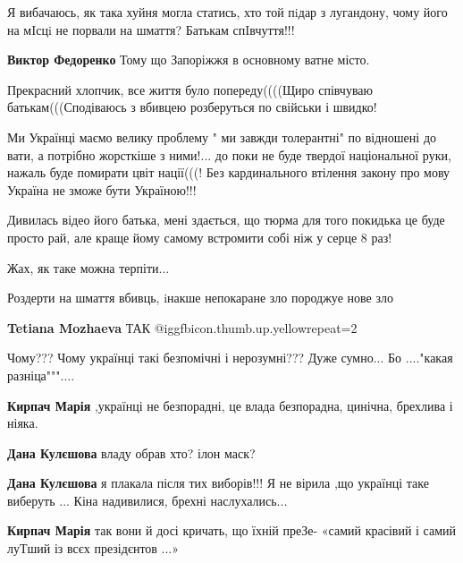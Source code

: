 \begin{itemize}

Я вибачаюсь, як така хуйня могла статись, хто той пiдар з лугандону, чому його
на мIсцi не порвали на шмаття? Батькам спIвчуття!!!

\begin{itemize} %
\textbf{Виктор Федоренко} Тому що Запоріжжя в основному ватне місто.
\end{itemize} %


Прекрасний хлопчик, все життя було попереду((((Щиро співчуваю
батькам(((Сподіваюсь з вбивцею розберуться по свійськи і швидко!


Ми Українці маємо велику проблему " ми завжди толерантні" по відношені до вати,
а потрібно жорсткіше з ними!... до поки не буде твердої національної
руки, нажаль буде помирати цвіт нації(((! Без кардинального втілення закону про
мову Україна не зможе бути Україною!!!


Дивилась відео його батька, мені здається, що тюрма для того покидька це буде
просто рай, але краще йому самому встромити собі ніж у серце 8 раз!

Жах, як таке можна терпіти...


Роздерти на шмаття вбивць, iнакше непокаране зло породжуе нове зло

\begin{itemize} %
\textbf{Tetiana Mozhaeva} ТАК @igg{fbicon.thumb.up.yellow}{repeat=2} 
\end{itemize} %

Чому???
Чому українці такі безпомічні і нерозумні???
Дуже сумно...
Бо ...."какая разніца"""....

\begin{itemize} %
\textbf{Кирпач Марія} ,українці не безпорадні, це влада безпорадна, цинічна, брехлива і ніяка.

\textbf{Дана Кулєшова} владу обрав хто? ілон маск?

\textbf{Дана Кулєшова} я плакала після тих виборів!!!
Я не вірила ,що українці таке виберуть ...
Кіна надивилися, брехні наслухались...

\textbf{Кирпач Марія} так вони й досі кричать, що їхній преЗе- «самий красівий і самий луТший із всєх презідєнтов ...»


\end{itemize}
\end{itemize}
